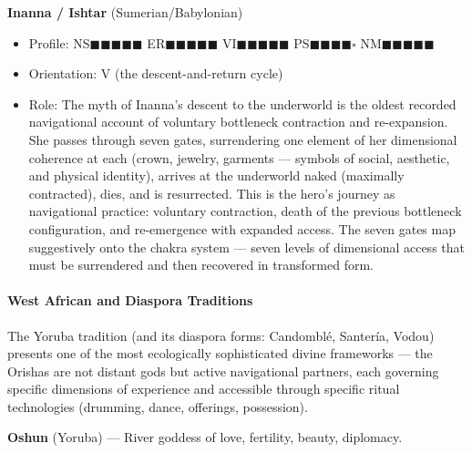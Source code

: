 \textbf{Inanna / Ishtar} (Sumerian/Babylonian)

\begin{itemize}[nosep,leftmargin=*]
  \item Profile: NS$\blacksquare$$\blacksquare$$\blacksquare$$\blacksquare$$\blacksquare$ ER$\blacksquare$$\blacksquare$$\blacksquare$$\blacksquare$$\blacksquare$ VI$\blacksquare$$\blacksquare$$\blacksquare$$\blacksquare$$\blacksquare$ PS$\blacksquare$$\blacksquare$$\blacksquare$$\blacksquare$$\square$ NM$\blacksquare$$\blacksquare$$\blacksquare$$\blacksquare$$\blacksquare$
  \item Orientation: V (the descent-and-return cycle)
  \item Role: The myth of Inanna's descent to the underworld is the oldest recorded navigational account of voluntary bottleneck contraction and re-expansion. She passes through seven gates, surrendering one element of her dimensional coherence at each (crown, jewelry, garments — symbols of social, aesthetic, and physical identity), arrives at the underworld naked (maximally contracted), dies, and is resurrected. This is the hero's journey as navigational practice: voluntary contraction, death of the previous bottleneck configuration, and re-emergence with expanded access. The seven gates map suggestively onto the chakra system — seven levels of dimensional access that must be surrendered and then recovered in transformed form.
\end{itemize}


\paragraph*{West African and Diaspora Traditions}


The Yoruba tradition (and its diaspora forms: Candomblé, Santería, Vodou) presents one of the most ecologically sophisticated divine frameworks — the Orishas are not distant gods but active navigational partners, each governing specific dimensions of experience and accessible through specific ritual technologies (drumming, dance, offerings, possession).


\textbf{Oshun} (Yoruba) — River goddess of love, fertility, beauty, diplomacy.

